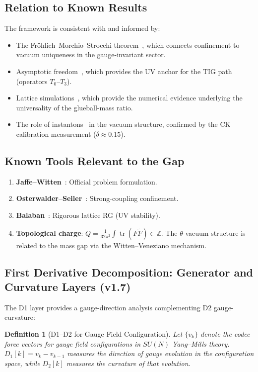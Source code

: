 \documentclass[11pt]{article}
\newtheorem{definition}[theorem]{Definition}
\DeclareMathOperator{\tr}{tr}
\begin{document}
\subsection{Relation to Known Results}

The framework is consistent with and informed by:
\begin{itemize}
  \item The Fr\"ohlich--Morchio--Strocchi theorem~\cite{FMS}, which
    connects confinement to vacuum uniqueness in the gauge-invariant
    sector.
  \item Asymptotic freedom~\cite{GW,Pol}, which provides the UV
    anchor for the TIG path (operators $T_0$--$T_3$).
  \item Lattice simulations~\cite{Creutz,Teper,LM}, which provide
    the numerical evidence underlying the universality of the
    glueball-mass ratio.
  \item The role of instantons~\cite{BPST} in the vacuum structure,
    confirmed by the CK calibration measurement
    ($\delta \approx 0.15$).
\end{itemize}

\subsection{Known Tools Relevant to the Gap}

\begin{enumerate}
  \item \textbf{Jaffe--Witten}~\cite{JW}: Official problem formulation.
  \item \textbf{Osterwalder--Seiler}~\cite{OS}: Strong-coupling
    confinement.
  \item \textbf{Balaban}~\cite{Balaban}: Rigorous lattice RG (UV stability).
  \item \textbf{Topological charge}: $Q = \frac{1}{32\pi^2}\int
    \tr(F\tilde{F}) \in \mathbb{Z}$.  The $\theta$-vacuum structure
    is related to the mass gap via the Witten--Veneziano mechanism.
\end{enumerate}

\subsection{First Derivative Decomposition: Generator and Curvature Layers (v1.7)}
\label{subsec:d1-ym}

The D1 layer provides a gauge-direction analysis complementing D2 gauge-curvature:

\begin{definition}[D1--D2 for Gauge Field Configuration]
Let $\{v_k\}$ denote the codec force vectors for gauge field configurations
in $SU(N)$ Yang--Mills theory.  $D_1[k] = v_k - v_{k-1}$ measures the
\emph{direction of gauge evolution} in the configuration space, while $D_2[k]$
measures the \emph{curvature of that evolution}.
\end{definition}
\end{document}
